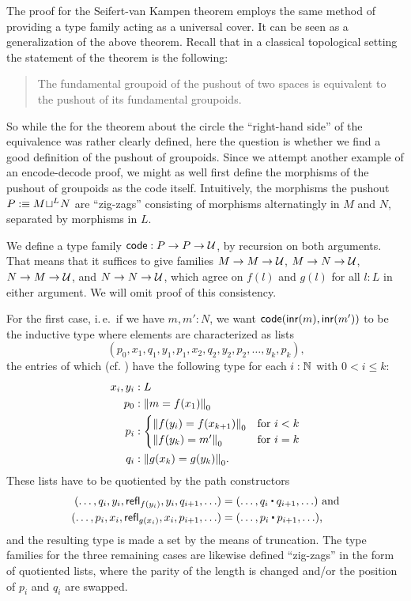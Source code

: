 The proof for the Seifert-van Kampen theorem employs the same method of
providing a type family acting as a universal cover.
It can be seen as a generalization of the above theorem.
Recall that in a classical topological setting the statement of the
theorem is the following:
\begin{quote}
The fundamental groupoid of the pushout of two spaces is equivalent to the pushout of
its fundamental groupoids.
\end{quote}
So while the for the theorem about the circle the ``right-hand side'' of the
equivalence was rather clearly defined, here the
question is whether we find a good definition of the pushout of groupoids.
Since we attempt another example of an encode-decode proof, we
might as well first define the morphisms of the pushout of groupoids as the
code itself.
Intuitively, the morphisms the pushout $P :\equiv \pout{L}{M}{N}$
are ``zig-zags'' consisting of morphisms
alternatingly in ${M}$ and ${N}$, separated by morphisms in $L$.
\begin{defn}
We define a type family $\code : P \to P \to \UU$, by recursion on both arguments.
That means that it suffices to give families $M \to M \to \UU$,
$M \to N \to \UU$, $N \to M \to \UU$, and $N \to N \to \UU$, which agree on
$f(l)$ and $g(l)$ for all $l : L$ in either argument.
We will omit proof of this consistency.

For the first case, i.\,e.\ if we have $m, m' : N$, we want $\code(\inr(m), \inr(m'))$ to be
the inductive type where elements are characterized as lists
\begin{equation*}
 (p_0, x_1, q_1, y_1, p_1, x_2, q_2, y_2, p_2, \ldots, y_k, p_k) \text{,}
\end{equation*}
the entries of which (cf. ) have the following type for
each $i : \N$ with $0 < i \leq k$:
\begin{align*}
x_i, y_i &: L \\
p_0 &: \trunc{0}{m = f(x_1)} \\
p_i &: \begin{cases} \trunc{0}{f(y_i) = f(x_{k + 1})} & \text{for $i < k$} \\
  \trunc{0}{f(y_k) = m'} & \text{for $i = k$}  \end{cases} \\
q_i &: \trunc{0}{g(x_k) = g(y_k)} \text{.}
\end{align*}
These lists have to be quotiented by the path constructors
\begin{align*}
(\ldots, q_i, y_i, \refl_{f(y_i)}, y_i, q_{i+1}, \ldots)
  &= (\ldots, q_i \ct q_{i+1}, \ldots) \text{ and} \\
(\ldots, p_i, x_i, \refl_{g(x_i)}, x_i, p_{i+1}, \ldots)
  &= (\ldots, p_i \ct p_{i+1}, \ldots) \text{,}
\end{align*}
and the resulting type is made a set by the means of truncation.
The type families for the three remaining cases are likewise defined
``zig-zags'' in the form of quotiented lists, where the parity of the length
is changed and/or the position of $p_i$ and $q_i$ are swapped.
\end{defn}

